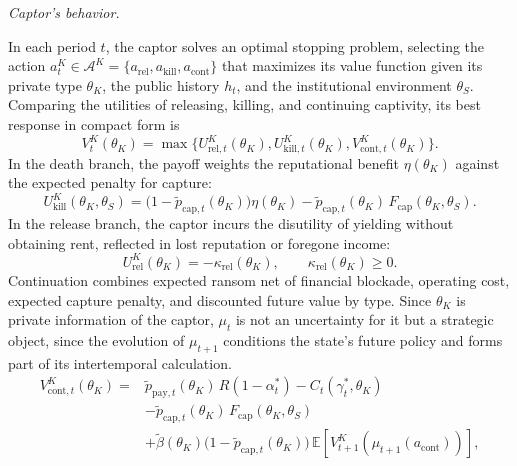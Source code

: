 \documentclass[review,authoryear,12pt]{elsarticle}
\theoremstyle{plain}
\theoremstyle{definition}
\newcommand{\E}{\mathbb{E}}
\newcommand{\1}{\mathbf{1}}
\begin{document}
\noindent\textit{Captor's behavior.}

\noindent In each period $t$, the captor solves an optimal stopping problem, selecting the action $a_t^K\in\mathcal{A}^K=\{a_{\mathrm{rel}},a_{\mathrm{kill}},a_{\mathrm{cont}}\}$ that maximizes its value function given its private type $\theta_K$, the public history $h_t$, and the institutional environment $\theta_S$. Comparing the utilities of releasing, killing, and continuing captivity, its best response in compact form is
\begin{equation}
V^K_t(\theta_K)=
\max\{U^K_{\mathrm{rel},t}(\theta_K),
U^K_{\mathrm{kill},t}(\theta_K),
V^K_{\mathrm{cont},t}(\theta_K)\}.
\label{eq:k-bellman}
\end{equation}
In the death branch, the payoff weights the reputational benefit $\eta(\theta_K)$ against the expected penalty for capture:
\begin{equation}
U^K_{\mathrm{kill}}(\theta_K,\theta_S)=\bigl(1-\tilde{p}_{\mathrm{cap},t}(\theta_K)\bigr)\eta(\theta_K)-\tilde{p}_{\mathrm{cap},t}(\theta_K)\,F_{\mathrm{cap}}(\theta_K,\theta_S).
\label{eq:k-kill}
\end{equation}
In the release branch, the captor incurs the disutility of yielding without obtaining rent, reflected in lost reputation or foregone income:
\begin{equation}
U^K_{\mathrm{rel}}(\theta_K)=-\kappa_{\mathrm{rel}}(\theta_K),\qquad\kappa_{\mathrm{rel}}(\theta_K)\ge 0.
\label{eq:k-rel}
\end{equation}
Continuation combines expected ransom net of financial blockade, operating cost, expected capture penalty, and discounted future value by type. Since $\theta_K$ is private information of the captor, $\mu_t$ is not an uncertainty for it but a strategic object, since the evolution of $\mu_{t+1}$ conditions the state's future policy and forms part of its intertemporal calculation.
\begin{equation}
\begin{aligned}
V^K_{\mathrm{cont},t}(\theta_K)
={}&\tilde{p}_{\mathrm{pay},t}(\theta_K)\,R(1-\alpha_t^\ast)
-C_t(\gamma_t^\ast,\theta_K)\\
&-\tilde{p}_{\mathrm{cap},t}(\theta_K)\,F_{\mathrm{cap}}(\theta_K,\theta_S)\\
&+\tilde{\beta}(\theta_K)\bigl(1-\tilde{p}_{\mathrm{cap},t}(\theta_K)\bigr)\,\E\!\left[V^K_{t+1}\!\left(\mu_{t+1}(a_{\mathrm{cont}})\right)\right],
\end{aligned}
\label{eq:kidnapper-cont}
\end{equation}
\end{document}
